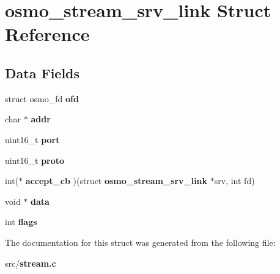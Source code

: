 \section{osmo\+\_\+stream\+\_\+srv\+\_\+link Struct Reference}
\label{structosmo__stream__srv__link}
\subsection*{Data Fields}
\begin{DoxyCompactItemize}
\item 
struct osmo\+\_\+fd {\bfseries ofd}\label{structosmo__stream__srv__link_a4989e1e6cbc6d6676ba1ed06b741a05f}

\item 
char $\ast$ {\bfseries addr}\label{structosmo__stream__srv__link_a6c0ff0391f4c3705b85964f0e13a7379}

\item 
uint16\+\_\+t {\bfseries port}\label{structosmo__stream__srv__link_ae2e02ca467db119118d839cc0a4f6eb4}

\item 
uint16\+\_\+t {\bfseries proto}\label{structosmo__stream__srv__link_af6b6972fd66cef3e6d3ef6a6fe790a5f}

\item 
int($\ast$ {\bfseries accept\+\_\+cb} )(struct {\bf osmo\+\_\+stream\+\_\+srv\+\_\+link} $\ast$srv, int fd)\label{structosmo__stream__srv__link_a9ead575ef31a1e835f0806eaf31c4c9f}

\item 
void $\ast$ {\bfseries data}\label{structosmo__stream__srv__link_aa05e87bd15c3a1cbd3b4b3a172da0f4f}

\item 
int {\bfseries flags}\label{structosmo__stream__srv__link_ab65902f1c69408604611f5f2b2dbad17}

\end{DoxyCompactItemize}


The documentation for this struct was generated from the following file\+:\begin{DoxyCompactItemize}
\item 
src/{\bf stream.\+c}\end{DoxyCompactItemize}
